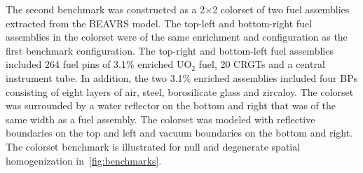 The second benchmark was constructed as a 2$\times$2 colorset of two fuel assemblies extracted from the BEAVRS model. The top-left and bottom-right fuel assemblies in the colorset were of the same enrichment and configuration as the first benchmark configuration. The top-right and bottom-left fuel assemblies included 264 fuel pins of 3.1\% enriched UO$_2$ fuel, 20 CRGTs and a central instrument tube. In addition, the two 3.1\% enriched assemblies included four BPs consisting of eight layers of air, steel, borosilicate glass and zircaloy. The colorset was surrounded by a water reflector on the bottom and right that was of the same width as a fuel assembly. The colorset was modeled with reflective boundaries on the top and left and vacuum boundaries on the bottom and right. The colorset benchmark is illustrated for null and degenerate spatial homogenization in~\autoref{fig:benchmarks}.

